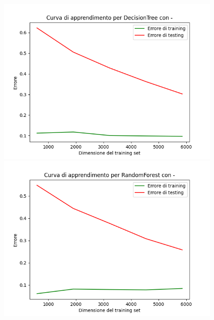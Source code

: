 \begin{figure}[H]
    \centering
    \begin{minipage}[b]{0.45\linewidth}
      \centering
      \includegraphics[scale=0.5]{img/learning_curve_DecisionTree_-.png}
      
    \end{minipage}
    \hfill
    \begin{minipage}[b]{0.45\linewidth}
      \centering
      \includegraphics[scale=0.5]{img/learning_curve_RandomForest_-.png}
      
    \end{minipage}
    

\end{figure}
